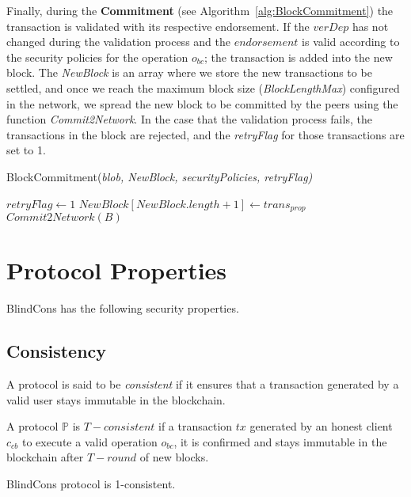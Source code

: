 \documentclass[conference]{llncs}
\newcommand{\name}{BlindCons}
\begin{document}
Finally, during the \textbf{Commitment} (see Algorithm~\ref{alg:BlockCommitment}) the transaction is validated with its respective endorsement. If the $verDep$ has not changed during the validation process and the $endorsement$ is valid according to the security policies for the operation $o_{bc}$; the transaction is added into the new block. The \textit{NewBlock} is an array where we store the new transactions to be settled, and once we reach the maximum block size (\textit{BlockLengthMax}) configured in the network, we spread the new block to be committed by the peers using the function \textit{Commit2Network}. In the case that the validation process fails, the transactions in the block are rejected, and the \textit{retryFlag} for those transactions are set to 1. 

\begin{algorithm}[ht]
\caption{BlockCommitment(\emph{blob, NewBlock, securityPolicies, retryFlag)}}
\label{alg:BlockCommitment}
\begin{algorithmic}[1]
\RETURN $retryFlag \gets 1$
\ELSE \STATE $NewBlock [NewBlock.length + 1] \gets trans_{prop}$ \ENDIF
{}
\RETURN $Commit2Network(B)$ \ENDIF
\end{algorithmic}
\end{algorithm}

\section{Protocol Properties}
\label{PROP}

\name{} has the following security properties.

\subsection{Consistency}
A protocol is said to be \emph{consistent} if it ensures that a transaction generated by a valid user stays immutable in the blockchain.

\begin{definition}
A protocol $\mathbb{P}$ is $T-consistent$ if a transaction $tx$ generated by an honest client $c_{cb}$ to execute a valid operation $o_{bc}$, it is confirmed and stays immutable in the blockchain after $T-round$ of new blocks.
\end{definition}

\begin{theorem} \name{} protocol is 1-consistent.
\end{theorem}
\end{document}
